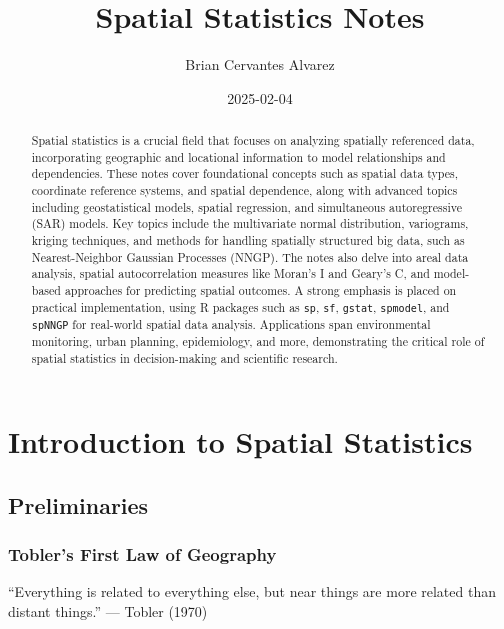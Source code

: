 \documentclass[
  11pt,
]{report}
\title{Spatial Statistics Notes}
\author{Brian Cervantes Alvarez}
\date{2025-02-04}
\renewcommand*\contentsname{Table of contents}
\newcommand\contentsname{Table of contents}
\begin{document}
\maketitle
\begin{abstract}
Spatial statistics is a crucial field that focuses on analyzing
spatially referenced data, incorporating geographic and locational
information to model relationships and dependencies. These notes cover
foundational concepts such as spatial data types, coordinate reference
systems, and spatial dependence, along with advanced topics including
geostatistical models, spatial regression, and simultaneous
autoregressive (SAR) models. Key topics include the multivariate normal
distribution, variograms, kriging techniques, and methods for handling
spatially structured big data, such as Nearest-Neighbor Gaussian
Processes (NNGP). The notes also delve into areal data analysis, spatial
autocorrelation measures like Moran's I and Geary's C, and model-based
approaches for predicting spatial outcomes. A strong emphasis is placed
on practical implementation, using R packages such as \texttt{sp},
\texttt{sf}, \texttt{gstat}, \texttt{spmodel}, and \texttt{spNNGP} for
real-world spatial data analysis. Applications span environmental
monitoring, urban planning, epidemiology, and more, demonstrating the
critical role of spatial statistics in decision-making and scientific
research.
\end{abstract}

\renewcommand*\contentsname{Table of contents}
{
\hypersetup{linkcolor=}
\setcounter{tocdepth}{2}
\tableofcontents
}

\chapter{Introduction to Spatial
Statistics}\label{introduction-to-spatial-statistics}

\section{Preliminaries}\label{preliminaries}

\subsection{Tobler's First Law of
Geography}\label{toblers-first-law-of-geography}

``Everything is related to everything else, but near things are more
related than distant things.'' --- Tobler (1970)
\end{document}

